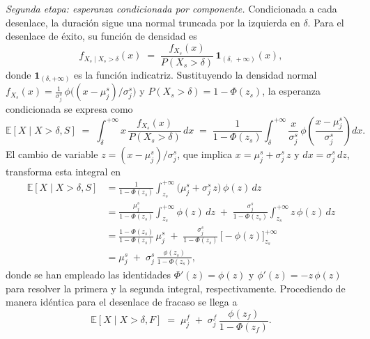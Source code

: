 \emph{Segunda etapa: esperanza condicionada por componente.} Condicionada a cada desenlace, la duración sigue una normal truncada por la izquierda en $\delta$. Para el desenlace de éxito, su función de densidad es
\begin{equation} \label{eq:trunc-density}
    f_{X_s\mid X_s>\delta}(x) \;=\; \frac{f_{X_s}(x)}{P(X_s>\delta)}\,\mathbf{1}_{(\delta,\,+\infty)}(x),
\end{equation}
donde $\mathbf{1}_{(\delta,+\infty)}$ es la función indicatriz. Sustituyendo la densidad normal $f_{X_s}(x)=\tfrac{1}{\sigma_j^{s}}\,\phi\!\bigl((x-\mu_j^{s})/\sigma_j^{s}\bigr)$ y $P(X_s>\delta)=1-\Phi(z_s)$, la esperanza condicionada se expresa como
\begin{equation} \label{eq:integrals-conditional}
    \mathbb{E}[X\mid X>\delta, S]
    \;=\; \int_{\delta}^{+\infty} x \, \frac{f_{X_s}(x)}{P(X_s>\delta)} \, dx
    \;=\; \frac{1}{1-\Phi(z_s)} \int_{\delta}^{+\infty} \frac{x}{\sigma_j^{s}}\,\phi\!\left(\frac{x-\mu_j^{s}}{\sigma_j^{s}}\right) dx.
\end{equation}
El cambio de variable $z=(x-\mu_j^{s})/\sigma_j^{s}$, que implica $x=\mu_j^{s}+\sigma_j^{s}\,z$ y $dx=\sigma_j^{s}\,dz$, transforma esta integral en
\begin{equation} \label{eq:integrals2-conditional}
\begin{split}
    \mathbb{E}[X\mid X>\delta, S]
    &= \frac{1}{1-\Phi(z_s)} \int_{z_s}^{+\infty} \bigl(\mu_j^{s}+\sigma_j^{s}\,z\bigr)\,\phi(z)\,dz \\[6pt]
    &= \frac{\mu_j^{s}}{1-\Phi(z_s)} \int_{z_s}^{+\infty} \phi(z)\,dz
       \;+\; \frac{\sigma_j^{s}}{1-\Phi(z_s)} \int_{z_s}^{+\infty} z\,\phi(z)\,dz \\[6pt]
    &= \frac{1-\Phi(z_s)}{1-\Phi(z_s)}\,\mu_j^{s}
       \;+\; \frac{\sigma_j^{s}}{1-\Phi(z_s)}\,\bigl[-\phi(z)\bigr]_{z_s}^{+\infty} \\[6pt]
    &= \mu_j^{s} \;+\; \sigma_j^{s}\,\frac{\phi(z_s)}{1-\Phi(z_s)},
\end{split}
\end{equation}
donde se han empleado las identidades $\Phi'(z)=\phi(z)$ y $\phi'(z)=-z\,\phi(z)$ para resolver la primera y la segunda integral, respectivamente. Procediendo de manera idéntica para el desenlace de fracaso se llega a
\begin{equation} \label{eq:integrals3-conditional}
    \mathbb{E}[X\mid X>\delta, F] \;=\; \mu_j^{f} \;+\; \sigma_j^{f}\,\frac{\phi(z_f)}{1-\Phi(z_f)}.
\end{equation}

